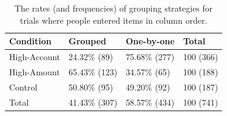 \begin{table}
\begin{itemize}
 
\begin{table}[]
\centering
\begin{tabular}{|l|l|l|l|}
\hline
Condition    & Grouped       & One-by-one    & Total     \\ \hline
High-Account & 24.32\% {\footnotesize (89)}     & 75.68\% {\footnotesize (277)}    & 100 {\footnotesize (366)} \\ \hline
High-Amount  & 65.43\% {\footnotesize (123)} & 34.57\% {\footnotesize (65)}  & 100 {\footnotesize (188)} \\ \hline
Control      & 50.80\% {\footnotesize (95)}  & 49.20\% {\footnotesize (92)}  & 100 {\footnotesize (187)} \\ \hline
Total        & 41.43\% {\footnotesize (307)} & 58.57\% {\footnotesize (434)} & 100 {\footnotesize (741)} \\ \hline
\end{tabular}
\caption{The rates (and frequencies) of grouping strategies for trials where people entered items in column order.}\label{table:ch34_group-column}
\end{table}



\end{itemize}
\end{table}
